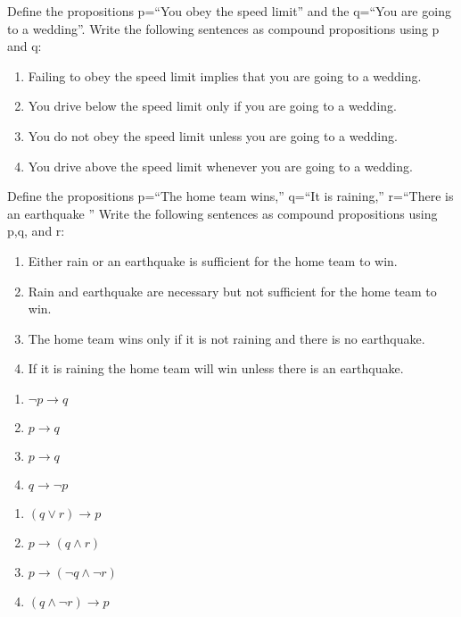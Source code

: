 \documentclass[solution, letterpaper]{cs20}
\begin{document}



\subproblem Define the propositions p=``You obey the speed limit'' and the q=``You are going to a wedding''. Write the following sentences as compound propositions using p and q: 
\begin{enumerate}
\item Failing to obey the speed limit implies that you are going to a wedding.
\item You drive below the speed limit only if you are going to a wedding. 
\item You do not obey the speed limit unless you are going to a wedding. 
\item You drive above the speed limit whenever you are going to a wedding. 
\end{enumerate}

\subproblem Define the propositions p=``The home team wins,'' q=``It is raining,'' r=``There is an earthquake '' Write the following sentences as compound propositions using p,q, and r:
\begin{enumerate}
\item Either rain or an earthquake is sufficient for the home team to win. 
\item Rain and earthquake are necessary but not sufficient for the home team to win. 
\item The home team wins only if it is not raining and there is no earthquake.
\item If it is raining the home team will win unless there is an earthquake.  
\end{enumerate}

\begin{solution}

\subsolution
\begin{enumerate}
\item $\neg p \to q$
\item $p \to q$
\item $p \to q$
\item $q \to \neg p$
\end{enumerate}

\subsolution
\begin{enumerate}
\item $(q \lor r) \to p$
\item $p \to (q \land r)$
\item $p \to (\neg q \land \neg r)$
\item $(q \land \neg r) \to p$
\end{enumerate}

\end{solution}
\end{document}
